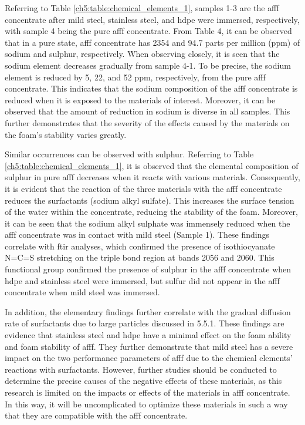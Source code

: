 Referring to Table \ref{ch5:table:chemical_elements_1}, samples 1-3 are the \acrshort{afff} concentrate after mild steel, stainless steel, and \acrshort{hdpe} were immersed, respectively, with sample 4 being the pure \acrshort{afff} concentrate. From Table 4, it can be observed that in a pure state, \acrshort{afff} concentrate has 2354 and 94.7 parts per million (ppm) of sodium and sulphur, respectively. When observing closely, it is seen that the sodium element decreases gradually from sample 4-1. To be precise, the sodium element is reduced by 5, 22, and 52 ppm, respectively, from the pure \acrshort{afff} concentrate. This indicates that the sodium composition of the \acrshort{afff} concentrate is reduced when it is exposed to the materials of interest. Moreover, it can be observed that the amount of reduction in sodium is diverse in all samples. This further demonstrates that the severity of the effects caused by the materials on the foam's stability varies greatly.

Similar occurrences can be observed with sulphur. Referring to Table \ref{ch5:table:chemical_elements_1}, it is observed that the elemental composition of sulphur in pure \acrshort{afff} decreases when it reacts with various materials. Consequently, it is evident that the reaction of the three materials with the \acrshort{afff} concentrate reduces the surfactants (sodium alkyl sulfate). This increases the surface tension of the water within the concentrate, reducing the stability of the foam. Moreover, it can be seen that the sodium alkyl sulphate was immensely reduced when the \acrshort{afff} concentrate was in contact with mild steel (Sample 1). These findings correlate with \acrshort{ftir} analyses, which confirmed the presence of isothiocyanate N=C=S stretching on the triple bond region at bands 2056 and 2060. This functional group confirmed the presence of sulphur in the \acrshort{afff} concentrate when \acrshort{hdpe} and stainless steel were immersed, but sulfur did not appear in the \acrshort{afff} concentrate when mild steel was immersed.

In addition, the elementary findings further correlate with the gradual diffusion rate of surfactants due to large particles discussed in 5.5.1. These findings are evidence that stainless steel and \acrshort{hdpe} have a minimal effect on the foam ability and foam stability of \acrshort{afff}. They further demonstrate that mild steel has a severe impact on the two performance parameters of \acrshort{afff} due to the chemical elements' reactions with surfactants. However, further studies should be conducted to determine the precise causes of the negative effects of these materials, as this research is limited on the impacts or effects of the materials in \acrshort{afff} concentrate. In this way, it will be uncomplicated to optimize these materials in such a way that they are compatible with the \acrshort{afff} concentrate.

